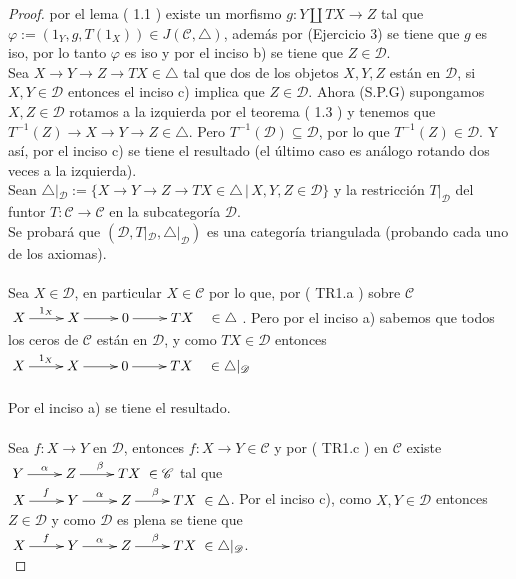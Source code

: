 \documentclass{article}
\begin{document}
\begin{enumerate}
\begin{proof}
por el lema ( 1.1 ) existe un morfismo $g:Y\coprod TX\longrightarrow Z$ tal que \\$\varphi:=(1_Y,g,T(1_X))\in J(\mathscr{C},\triangle)$, además por
 (Ejercicio 3) se tiene que $g$ es iso, por lo tanto $\varphi$ es iso y por el inciso b) se tiene que $Z\in \mathscr{D}$.\\

 Sea $X\to Y\to Z\to TX \in \triangle$ tal que dos de los objetos $X,Y,Z$ están en $\mathscr{D}$, si $X,Y\in \mathscr{D}$ entonces el 
inciso c) implica que $Z\in \mathscr{D}$. Ahora (S.P.G) supongamos $X,Z\in \mathscr{D}$ rotamos a la izquierda por el teorema ( 1.3 ) y tenemos 
que $T^{-1}(Z)\to X\to Y\to Z\in \triangle$. Pero $T^{-1}(\mathscr{D})\subseteq \mathscr{D}$, por lo que $T^{-1}(Z)\in \mathscr{D}$. 
Y así, por el inciso c) se tiene el resultado (el último caso es análogo rotando dos veces a la izquierda).\\

 Sean $\triangle|_{\mathscr{D}}:=\{X\to Y\to Z\to TX\in \triangle\,|\, X,Y,Z\in \mathscr{D}\}$ y la restricción $T|_{\mathscr{D}}$ del
funtor $T:\mathscr{C}\longrightarrow \mathscr{C}$ en la subcategoría $\mathscr{D}$.\\

Se probará que $(\mathscr{D},T|_{\mathscr{D}},\triangle|_{\mathscr{D}})$ es una categoría triangulada (probando cada uno de los axiomas).\\

\\
Sea $X\in \mathscr{D}$, en particular  $X\in \mathscr{C}$ por lo que, por ( TR1.a ) sobre $\mathscr{C}$
\\$\xymatrix{X\ar[r]^{1_X}&X\ar[r]&0\ar[r]&TX\quad\in \triangle}$.
Pero por el inciso a) sabemos que todos los ceros de $\mathscr{C}$ están en $\mathscr{D}$, y como $TX\in \mathscr{D}$  entonces \\
$\xymatrix{X\ar[r]^{1_X}&X\ar[r]&0\ar[r]&TX\quad\in \triangle|_{\mathscr{D}}}$\\

\\
Por el inciso a) se tiene el resultado.\\

\\
Sea $f:X\to Y$ en $\mathscr{D}$, entonces $f:X\to Y\in \mathscr{C}$ y por ( TR1.c ) en $\mathscr{C}$ existe
$\xymatrix{Y\ar[r]^{\alpha}&Z\ar[r]^{\beta}&TX}\in \mathscr{C}$ tal que \\
$\xymatrix{X\ar[r]^{f}&Y\ar[r]^{\alpha}&Z\ar[r]^{\beta}&TX}\in \triangle$. Por el inciso c), como $X,Y\in \mathscr{D}$ entonces $Z\in \mathscr{D}$
y como $\mathscr{D}$ es plena se tiene que \\$\xymatrix{X\ar[r]^{f}&Y\ar[r]^{\alpha}&Z\ar[r]^{\beta}&TX}\in \triangle|_{\mathscr{D}}$.\\


\end{proof}
\end{enumerate}
\end{document}
